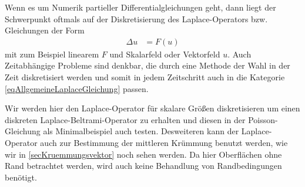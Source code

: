   \begin{ziel}
    Wenn es um Numerik partieller Differentialgleichungen geht, dann liegt der Schwerpunkt oftmals auf der Diskretisierung des Laplace-Operators bzw. Gleichungen der Form
    \begin{align}
      \label{eqAllgemeineLaplaceGleichung}
      \Delta u &= F(u)
    \end{align}
    mit zum Beispiel linearem \( F \) und Skalarfeld oder Vektorfeld \( u \).
    Auch Zeitabhängige Probleme sind denkbar, die durch eine Methode der Wahl in der Zeit diskretisiert werden 
    und somit in jedem Zeitschritt auch in die Kategorie \eqref{eqAllgemeineLaplaceGleichung} passen.

    Wir werden hier den Laplace-Operator für skalare Größen diskretisieren um einen diskreten Laplace-Beltrami-Operator zu erhalten und diesen in der Poisson-Gleichung als Minimalbeispiel
    auch testen. Desweiteren kann der Laplace-Operator auch zur Bestimmung der mittleren Krümmung benutzt
    werden, wie wir in \ref{secKruemmungsvektor} noch sehen werden.
    Da hier Oberflächen ohne Rand betrachtet werden, wird auch keine Behandlung von Randbedingungen
    benötigt.
  \end{ziel}

